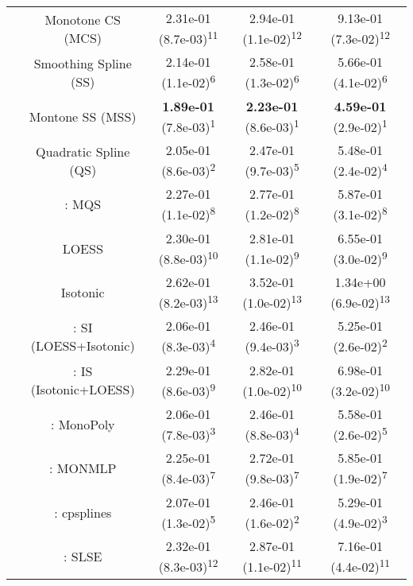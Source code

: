\begin{tabular}{ccccc}
&Monotone CS (MCS)& 2.31e-01 (8.7e-03)\textsuperscript{11}& 2.94e-01 (1.1e-02)\textsuperscript{12}& 9.13e-01 (7.3e-02)\textsuperscript{12}\tabularnewline
&Smoothing Spline (SS)& 2.14e-01 (1.1e-02)\textsuperscript{6}& 2.58e-01 (1.3e-02)\textsuperscript{6}& 5.66e-01 (4.1e-02)\textsuperscript{6}\tabularnewline
&Montone SS (MSS)& \textbf{1.89e-01} (7.8e-03)\textsuperscript{1}& \textbf{2.23e-01} (8.6e-03)\textsuperscript{1}& \textbf{4.59e-01} (2.9e-02)\textsuperscript{1}\tabularnewline
&Quadratic Spline (QS)& 2.05e-01 (8.6e-03)\textsuperscript{2}& 2.47e-01 (9.7e-03)\textsuperscript{5}& 5.48e-01 (2.4e-02)\textsuperscript{4}\tabularnewline
&\textcite{heMonotoneBsplineSmoothing1998}: MQS& 2.27e-01 (1.1e-02)\textsuperscript{8}& 2.77e-01 (1.2e-02)\textsuperscript{8}& 5.87e-01 (3.1e-02)\textsuperscript{8}\tabularnewline
&LOESS& 2.30e-01 (8.8e-03)\textsuperscript{10}& 2.81e-01 (1.1e-02)\textsuperscript{9}& 6.55e-01 (3.0e-02)\textsuperscript{9}\tabularnewline
&Isotonic& 2.62e-01 (8.2e-03)\textsuperscript{13}& 3.52e-01 (1.0e-02)\textsuperscript{13}& 1.34e+00 (6.9e-02)\textsuperscript{13}\tabularnewline
&\textcite{mammenEstimatingSmoothMonotone1991}: SI (LOESS+Isotonic)& 2.06e-01 (8.3e-03)\textsuperscript{4}& 2.46e-01 (9.4e-03)\textsuperscript{3}& 5.25e-01 (2.6e-02)\textsuperscript{2}\tabularnewline
&\textcite{mammenEstimatingSmoothMonotone1991}: IS (Isotonic+LOESS)& 2.29e-01 (8.6e-03)\textsuperscript{9}& 2.82e-01 (1.0e-02)\textsuperscript{10}& 6.98e-01 (3.2e-02)\textsuperscript{10}\tabularnewline
&\textcite{murrayFastFlexibleMethods2016a}: MonoPoly& 2.06e-01 (7.8e-03)\textsuperscript{3}& 2.46e-01 (8.8e-03)\textsuperscript{4}& 5.58e-01 (2.6e-02)\textsuperscript{5}\tabularnewline
&\textcite{cannonMonmlpMultilayerPerceptron2017}: MONMLP& 2.25e-01 (8.4e-03)\textsuperscript{7}& 2.72e-01 (9.8e-03)\textsuperscript{7}& 5.85e-01 (1.9e-02)\textsuperscript{7}\tabularnewline
&\textcite{navarro-garciaConstrainedSmoothingOutofrange2023}: cpsplines& 2.07e-01 (1.3e-02)\textsuperscript{5}& 2.46e-01 (1.6e-02)\textsuperscript{2}& 5.29e-01 (4.9e-02)\textsuperscript{3}\tabularnewline
&\textcite{groeneboomConfidenceIntervalsMonotone2023}: SLSE& 2.32e-01 (8.3e-03)\textsuperscript{12}& 2.87e-01 (1.1e-02)\textsuperscript{11}& 7.16e-01 (4.4e-02)\textsuperscript{11}\tabularnewline
\bottomrule
\end{tabular}
